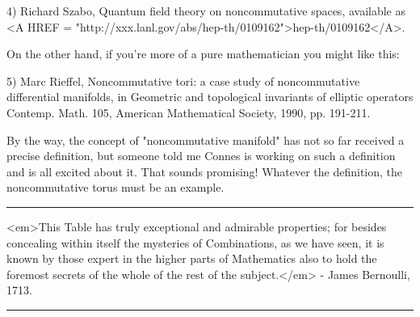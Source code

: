 4) Richard Szabo, Quantum field theory on noncommutative spaces,
available as <A HREF = "http://xxx.lanl.gov/abs/hep-th/0109162">hep-th/0109162</A>.  

On the other hand, if you're more of a pure mathematician you
might like this:

5) Marc Rieffel, Noncommutative tori: a case study of noncommutative
differential manifolds, in Geometric and topological invariants of
elliptic operators Contemp. Math. 105, American Mathematical Society,
1990, pp. 191-211.

By the way, the concept of "noncommutative manifold" has not so far
received a precise definition, but someone told me Connes is working on
such a definition and is all excited about it.  That sounds promising!
Whatever the definition, the noncommutative torus must be an example.

\par\noindent\rule{\textwidth}{0.4pt}
<em>This Table has truly exceptional and admirable properties;
for besides concealing within itself the mysteries of Combinations,
as we have seen, it is known by those expert in the higher parts of
Mathematics also to hold the foremost secrets of the whole of the
rest of the subject.</em> - James Bernoulli, 1713.

\par\noindent\rule{\textwidth}{0.4pt}

